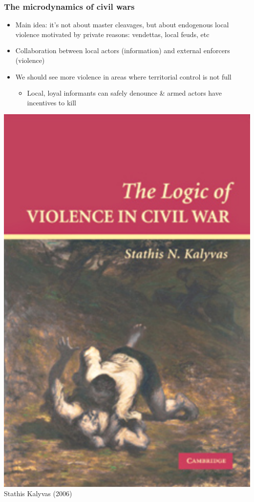\documentclass[utf8, xcolor=dvipsnames, handout]{beamer}
\begin{document}
\begin{frame}
\frametitle{The microdynamics of civil wars}
\centering

\begin{minipage}{0.69\textwidth}\centering
\begin{itemize}
  \item<2-> Main idea: it's not about master cleavages, but about endogenous local violence motivated by private reasons: vendettas, local feuds, etc
  \item<3-> Collaboration between local actors (information) and external enforcers (violence)
  \item<4-> We should see more violence in areas where territorial control is not full
  \begin{itemize}
    \item Local, loyal informants can safely denounce \& armed actors have incentives to kill
  \end{itemize}
\end{itemize}
\end{minipage}\hfill
\begin{minipage}{0.3\textwidth}\centering
\includegraphics[width = \textwidth]{img/kalyvas2006}\\
{\footnotesize Stathis Kalyvas (2006)}
\end{minipage}

\end{frame}
\end{document}
